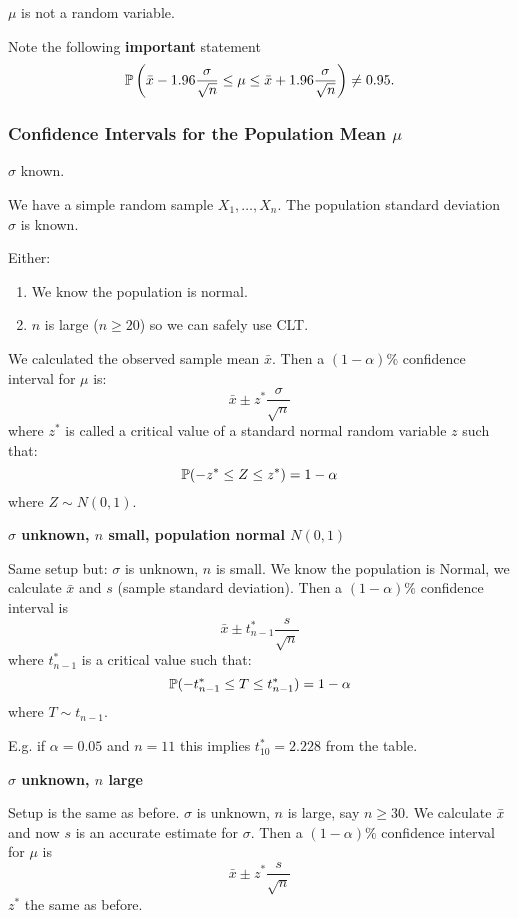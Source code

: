 \documentclass[10pt, a4paper]{article}
\begin{document}
$\mu$ is not a random variable.

Note the following \textbf{important} statement
\[
\P\left(\Bar{x} - 1.96\frac{\sigma}{\sqrt{n}} \leq \mu \leq \Bar{x} + 1.96\frac{\sigma}{\sqrt{n}}\right) \neq 0.95.
\]

\subsubsection{Confidence Intervals for the Population Mean \texorpdfstring{$\mu$}{}}

$\sigma$ known.

We have a simple random sample $X_1, \dotsc, X_n$.
The population standard deviation $\sigma$ is known.

Either:
\begin{enumerate}[label = \alph*)]
    \item We know the population is normal.

    \item $n$ is large
    ($n \geq 20$)
    so we can safely use CLT.
\end{enumerate}
We calculated the observed sample mean $\bar{x}$.
Then a $(1 - \alpha)\%$ confidence interval for $\mu$ is:
\[
\bar{x} \pm z ^ {*}\frac{\sigma}{\sqrt{n}}
\]
where $z ^ {*}$ is called a critical value of a standard normal random variable $z$ such that:
\[
\P(-z ^ {*} \leq Z \leq z ^ {*}) = 1 - \alpha
\]
where $Z \sim N(0, 1)$.

\textbf{$\sigma$ unknown,
$n$ small,
population normal $N(0, 1)$}

Same setup but:
$\sigma$ is unknown,
$n$ is small.
We know the population is Normal,
we calculate $\bar{x}$ and $s$
(sample standard deviation).
Then a $(1 - \alpha)\%$ confidence interval is
\[
\bar{x} \pm t_{n - 1} ^ {*}\frac{s}{\sqrt{n}}
\]
where $t_{n - 1} ^ {*}$ is a critical value such that:
\[
\P(-t_{n - 1} ^ {*} \leq T \leq t_{n - 1} ^ {*}) = 1 - \alpha
\]
where $T \sim t_{n - 1}$.

E.g.
if $\alpha = 0.05$ and $n = 11$ this implies $t_{10} ^ {*} = 2.228$ from the table.

\textbf{$\sigma$ unknown,
$n$ large}

Setup is the same as before.
$\sigma$ is unknown,
$n$ is large,
say $n \geq 30$.
We calculate $\Bar{x}$ and now $s$ is an accurate estimate for $\sigma$.
Then a $(1 - \alpha)\%$ confidence interval for $\mu$ is
\[
\bar{x} \pm z ^ {*}\frac{s}{\sqrt{n}}
\]
$z ^ {*}$ the same as before.
\end{document}
